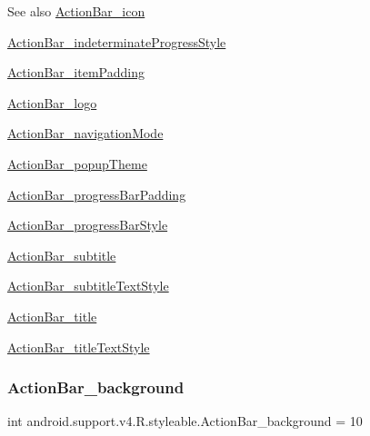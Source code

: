 \begin{DoxySeeAlso}{See also}
\hyperlink{classandroid_1_1support_1_1v4_1_1R_1_1styleable_aaa9149c39fa694d73adbfce1bf7a2147}{Action\+Bar\+\_\+icon} 

\hyperlink{classandroid_1_1support_1_1v4_1_1R_1_1styleable_a044b37dfc919ff9fb71d66587fe8f559}{Action\+Bar\+\_\+indeterminate\+Progress\+Style} 

\hyperlink{classandroid_1_1support_1_1v4_1_1R_1_1styleable_a8548ce153987b04b5d4798301bc48594}{Action\+Bar\+\_\+item\+Padding} 

\hyperlink{classandroid_1_1support_1_1v4_1_1R_1_1styleable_aaa9284e4203b58e1c1be7d41138d3b94}{Action\+Bar\+\_\+logo} 

\hyperlink{classandroid_1_1support_1_1v4_1_1R_1_1styleable_a0f55fffd685c46c93b83a67738984c79}{Action\+Bar\+\_\+navigation\+Mode} 

\hyperlink{classandroid_1_1support_1_1v4_1_1R_1_1styleable_af119aa9f8a6ea23d2126ea383dabfecf}{Action\+Bar\+\_\+popup\+Theme} 

\hyperlink{classandroid_1_1support_1_1v4_1_1R_1_1styleable_abfc806e138832b59961a03dd3ea028a5}{Action\+Bar\+\_\+progress\+Bar\+Padding} 

\hyperlink{classandroid_1_1support_1_1v4_1_1R_1_1styleable_a8a084dd5197bac512fb1f451fe3c4f09}{Action\+Bar\+\_\+progress\+Bar\+Style} 

\hyperlink{classandroid_1_1support_1_1v4_1_1R_1_1styleable_a1738ca6c1d0d6244db6783c6990e20a8}{Action\+Bar\+\_\+subtitle} 

\hyperlink{classandroid_1_1support_1_1v4_1_1R_1_1styleable_abd6b087231fbace7aa513febebda8b29}{Action\+Bar\+\_\+subtitle\+Text\+Style} 

\hyperlink{classandroid_1_1support_1_1v4_1_1R_1_1styleable_a342a7d8b0f7041ad4c7860c268da0784}{Action\+Bar\+\_\+title} 

\hyperlink{classandroid_1_1support_1_1v4_1_1R_1_1styleable_a185298c5a3c99e803809f41a523be2a6}{Action\+Bar\+\_\+title\+Text\+Style} 
\end{DoxySeeAlso}
\mbox{\label{classandroid_1_1support_1_1v4_1_1R_1_1styleable_a94adf52e3aef74eee3f46cc8699d6d08}} 
\subsubsection{\texorpdfstring{Action\+Bar\+\_\+background}{ActionBar\_background}}
{\footnotesize\ttfamily int android.\+support.\+v4.\+R.\+styleable.\+Action\+Bar\+\_\+background = 10\hspace{0.3cm}{\ttfamily [static]}}

